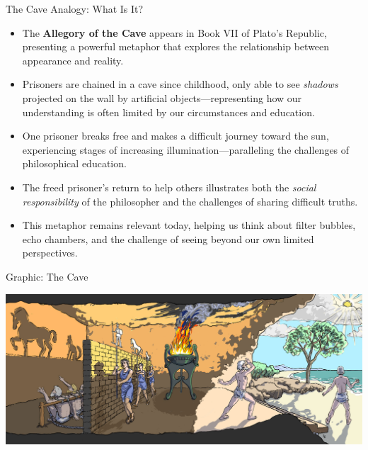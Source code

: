 \documentclass[aspectratio=169]{beamer}
\begin{document}
\begin{frame}{The Cave Analogy: What Is It?}
\begin{itemize}
\item The \textbf{Allegory of the Cave} appears in Book VII of Plato's Republic, presenting a powerful metaphor that explores the relationship between appearance and reality.
\item Prisoners are chained in a cave since childhood, only able to see \emph{shadows} projected on the wall by artificial objects—representing how our understanding is often limited by our circumstances and education.
\item One prisoner breaks free and makes a difficult journey toward the sun, experiencing stages of increasing illumination—paralleling the challenges of philosophical education.
\item The freed prisoner's return to help others illustrates both the \emph{social responsibility} of the philosopher and the challenges of sharing difficult truths.
\item This metaphor remains relevant today, helping us think about filter bubbles, echo chambers, and the challenge of seeing beyond our own limited perspectives.
\end{itemize}
\end{frame}


\begin{frame}{Graphic: The Cave}
    
    \includegraphics[scale=.20]{PlatoCave.jpg}
    
\end{frame}
\end{document}
